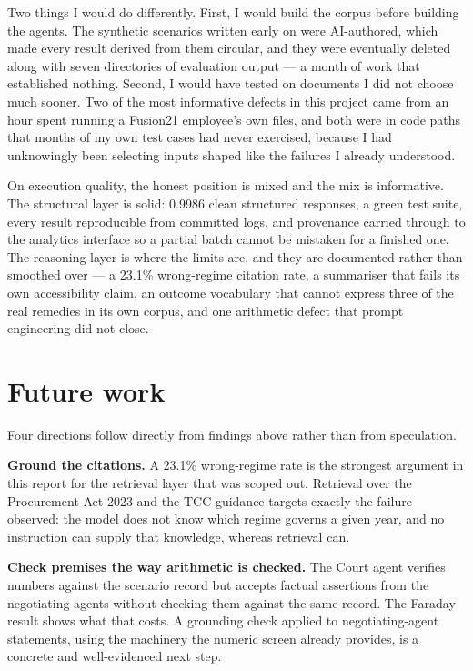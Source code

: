 Two things I would do differently. First, I would build the corpus before building
the agents. The synthetic scenarios written early on were AI-authored, which made
every result derived from them circular, and they were eventually deleted along
with seven directories of evaluation output --- a month of work that established
nothing. Second, I would have tested on documents I did not choose much sooner.
Two of the most informative defects in this project came from an hour spent
running a Fusion21 employee's own files, and both were in code paths that months
of my own test cases had never exercised, because I had unknowingly been selecting
inputs shaped like the failures I already understood.

On execution quality, the honest position is mixed and the mix is informative. The
structural layer is solid: 0.9986 clean structured responses, a green test suite,
every result reproducible from committed logs, and provenance carried through to
the analytics interface so a partial batch cannot be mistaken for a finished one.
The reasoning layer is where the limits are, and they are documented rather than
smoothed over --- a 23.1\% wrong-regime citation rate, a summariser that fails its
own accessibility claim, an outcome vocabulary that cannot express three of the
real remedies in its own corpus, and one arithmetic defect that prompt engineering
did not close.

\section{Future work}

Four directions follow directly from findings above rather than from speculation.

\textbf{Ground the citations.} A 23.1\% wrong-regime rate is the strongest
argument in this report for the retrieval layer that was scoped out. Retrieval
over the Procurement Act 2023 and the TCC guidance targets exactly the failure
observed: the model does not know which regime governs a given year, and no
instruction can supply that knowledge, whereas retrieval can.

\textbf{Check premises the way arithmetic is checked.} The Court agent verifies
numbers against the scenario record but accepts factual assertions from the
negotiating agents without checking them against the same record. The Faraday
result shows what that costs. A grounding check applied to negotiating-agent
statements, using the machinery the numeric screen already provides, is a
concrete and well-evidenced next step.

